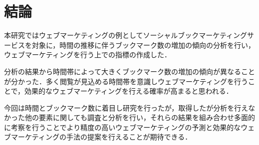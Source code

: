 \newpage

\chapter{結論}
本研究ではウェブマーケティングの例としてソーシャルブックマーケティングサービスを対象に，時間の推移に伴うブックマーク数の増加の傾向の分析を行い，ウェブマーケティングを行う上での指標の作成した．\par
分析の結果から時間帯によって大きくブックマーク数の増加の傾向が異なることが分かった．多く閲覧が見込める時間帯を意識しウェブマーケティングを行うことで，効果的なウェブマーケティングを行える確率が高まると思われる．\par
今回は時間とブックマーク数に着目し研究を行ったが，取得したが分析を行えなかった他の要素に関しても調査と分析を行い，それらの結果を組み合わせ多面的に考察を行うことでより精度の高いウェブマーケティングの予測と効果的なウェブマーケティングの手法の提案を行えることが期待できる．







